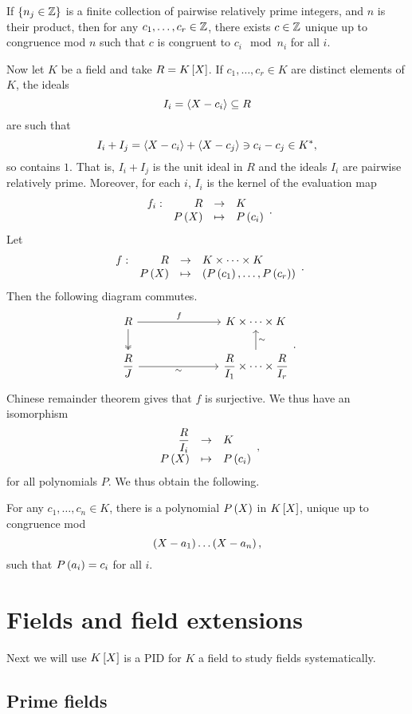 \begin{theorem}
If $ \cb{n_j \in \Z} $ is a finite collection of pairwise relatively prime integers, and $ n $ is their product, then for any $ c_1, \dots, c_r \in \Z $, there exists $ c \in \Z $ unique up to congruence mod $ n $ such that $ c $ is congruent to $ c_i \mod n_i $ for all $ i $.
\end{theorem}

Now let $ K $ be a field and take $ R = K\sb{X} $. If $ c_1, \dots, c_r \in K $ are distinct elements of $ K $, the ideals
$$ I_i = \ab{X - c_i} \subseteq R $$
are such that
$$ I_i + I_j = \ab{X - c_i} + \ab{X - c_j} \ni c_i - c_j \in K^*, $$
so contains $ 1 $. That is, $ I_i + I_j $ is the unit ideal in $ R $ and the ideals $ I_i $ are pairwise relatively prime. Moreover, for each $ i $, $ I_i $ is the kernel of the evaluation map
$$ \function[f_i]{R}{K}{P\rb{X}}{P\rb{c_i}}. $$
Let
$$ \function[f]{R}{K \times \dots \times K}{P\rb{X}}{\rb{P\rb{c_1}, \dots, P\rb{c_r}}}. $$
Then the following diagram commutes.
$$
\begin{tikzcd}[column sep=1in]
R \arrow{r}{f} \arrow[twoheadrightarrow]{d} & K \times \dots \times K \\
\dfrac{R}{J} \arrow[swap]{r}{\sim} & \dfrac{R}{I_1} \times \dots \times \dfrac{R}{I_r} \arrow[swap]{u}{\sim}
\end{tikzcd}.
$$
Chinese remainder theorem gives that $ f $ is surjective. We thus have an isomorphism
$$ \function{\dfrac{R}{I_i}}{K}{P\rb{X}}{P\rb{c_i}}, $$
for all polynomials $ P $. We thus obtain the following.

\begin{theorem}
For any $ c_1, \dots, c_n \in K $, there is a polynomial $ P\rb{X} $ in $ K\sb{X} $, unique up to congruence mod
$$ \rb{X - a_1} \dots \rb{X - a_n}, $$
such that $ P\rb{a_i} = c_i $ for all $ i $.
\end{theorem}

\pagebreak

\section{Fields and field extensions}


Next we will use $ K\sb{X} $ is a PID for $ K $ a field to study fields systematically.

\subsection{Prime fields}

